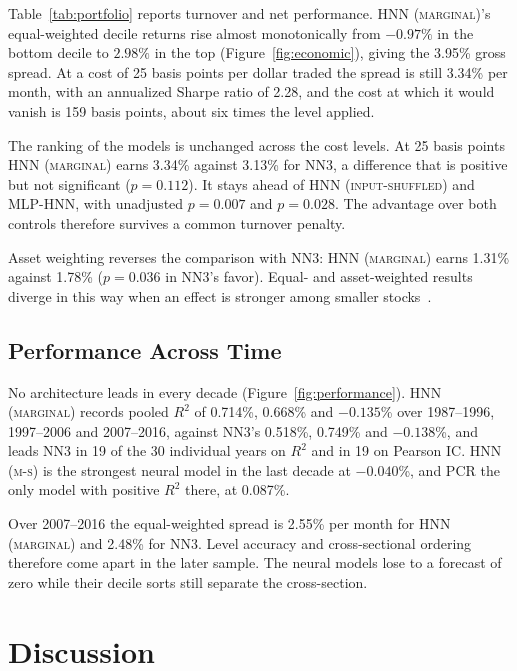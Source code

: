 \documentclass[sigconf,nonacm]{acmart}
\newcommand{\HNNWinYears}{19}
\newcommand{\HNNPearsonWinYears}{19}
\newcommand{\HNNNetEW}{3.34}
\newcommand{\HNNNetEWSR}{2.28}
\newcommand{\HNNBreakEvenEW}{159}
\newcommand{\HNNNetAW}{1.31}
\newcommand{\NNNetEW}{3.13}
\newcommand{\NNNetAW}{1.78}
\newcommand{\HNNNNNetP}{0.112}
\newcommand{\HNNNNNetAWP}{0.036}
\newcommand{\HNNShuffleNetP}{0.007}
\newcommand{\HNNDenseNetP}{0.028}
\newcommand{\HNNMarg}{\textsc{HNN (marginal)}}
\newcommand{\HNNMS}{\textsc{HNN (m-s)}}
\newcommand{\HNNShuffle}{\textsc{HNN (input-shuffled)}}
\newcommand{\MLPHNN}{\textsc{MLP-HNN}}
\newcommand{\NNThree}{\textsc{NN3}}
\begin{document}
Table~\ref{tab:portfolio} reports turnover and net performance. \HNNMarg{}'s
equal-weighted decile returns rise almost monotonically from \(-0.97\%\) in the
bottom decile to \(2.98\%\) in the top (Figure~\ref{fig:economic}), giving the
3.95\% gross spread. At a cost of 25 basis points per dollar traded the spread
is still \HNNNetEW\% per month, with an annualized Sharpe ratio of
\HNNNetEWSR{}, and the cost at which it would vanish is \HNNBreakEvenEW{} basis
points, about six times the level applied. 

The ranking of the models is unchanged across the cost levels. At 25 basis
points \HNNMarg{} earns \HNNNetEW\% against \NNNetEW\% for \NNThree{}, a
difference that is positive but not significant (\(p=\HNNNNNetP\)). It stays
ahead of \HNNShuffle{} and \MLPHNN{}, with unadjusted \(p=\HNNShuffleNetP\) and
\(p=\HNNDenseNetP\). The advantage over both controls therefore survives a
common turnover penalty.



Asset weighting reverses the comparison with \NNThree{}: \HNNMarg{} earns
\HNNNetAW\% against \NNNetAW\% (\(p=\HNNNNNetAWP\) in \NNThree{}'s favor).
Equal- and asset-weighted results diverge in this way when an effect is stronger
among smaller stocks~\cite{famafrench2008}.





\subsection{Performance Across Time}

No architecture leads in every decade (Figure~\ref{fig:performance}).
\HNNMarg{} records pooled \(R^2\) of 0.714\%, 0.668\% and \(-0.135\)\% over
1987--1996, 1997--2006 and 2007--2016, against \NNThree{}'s 0.518\%, 0.749\% and
\(-0.138\)\%, and leads \NNThree{} in \HNNWinYears{} of the 30 individual years
on \(R^2\) and in \HNNPearsonWinYears{} on Pearson IC. \HNNMS{} is the strongest
neural model in the last decade at \(-0.040\)\%, and PCR the only model with
positive \(R^2\) there, at 0.087\%.

Over 2007--2016 the equal-weighted spread is 2.55\% per month for \HNNMarg{} and
2.48\% for \NNThree{}. Level accuracy and cross-sectional ordering therefore come
apart in the later sample. The neural models lose to a forecast of zero while
their decile sorts still separate the cross-section.


\section{Discussion}\label{dis}
\end{document}
